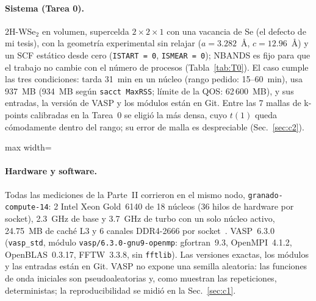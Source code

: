 \documentclass[11pt,a4paper]{article}
\newcommand{\cod}[1]{\texttt{#1}}
\begin{document}
\paragraph{Sistema (Tarea 0).} 2H-WSe$_2$ en volumen, supercelda $2\times2\times1$ con una vacancia de Se
(el defecto de mi tesis), con la geometría experimental sin relajar ($a=3.282$~Å, $c=12.96$~Å) y un SCF
estático desde cero (\cod{ISTART = 0}, \cod{ISMEAR = 0}); NBANDS es fijo para que el trabajo no cambie
con el número de procesos (Tabla~\ref{tab:T0}). El caso cumple las tres condiciones: tarda 31~min en un
núcleo (rango pedido: 15--60~min), usa 937~MB (934~MB según \cod{sacct MaxRSS}; límite de la QOS:
62\,600~MB), y sus entradas, la versión de VASP y los módulos están en Git. Entre las 7 mallas de k-points
calibradas en la Tarea~0 se eligió la más densa, cuyo $t(1)$ queda cómodamente dentro del rango; su error de
malla es despreciable (Sec.~\ref{sec:c2}).

\begin{table}[H]
\centering\small
\begin{adjustbox}{max width=\textwidth}\end{adjustbox}
\caption{Caso base (Tarea 0). Memoria estimada: la que VASP calcula al arrancar; medida: máximo del OUTCAR
con 1 núcleo.}
\label{tab:T0}
\end{table}

\paragraph{Hardware y software.} Todas las mediciones de la Parte~II corrieron en el mismo nodo,
\cod{granado-compute-14}: 2 Intel Xeon Gold~6140 de 18 núcleos (36 hilos de hardware por socket), 2.3~GHz
de base y 3.7~GHz de turbo con un solo núcleo activo, 24.75~MB de caché L3 y 6 canales DDR4-2666 por
socket~\cite{intel}. VASP~6.3.0 (\cod{vasp\_std}, módulo \cod{vasp/6.3.0-gnu9-openmp}: gfortran~9.3,
OpenMPI~4.1.2, OpenBLAS~0.3.17, FFTW~3.3.8, sin \cod{fftlib}). Las versiones exactas, los módulos y las
entradas están en Git. VASP no expone una semilla aleatoria: las funciones de onda iniciales son
pseudoaleatorias y, como muestran las repeticiones, deterministas; la reproducibilidad se midió en la
Sec.~\ref{sec:c1}.
\end{document}
